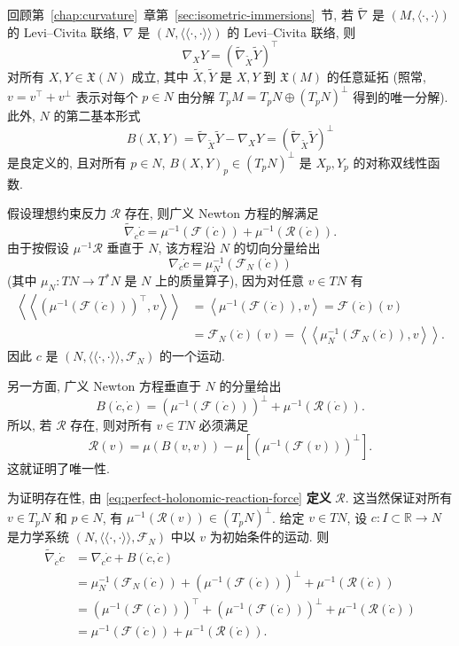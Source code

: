 \begin{RiemannProof}
回顾第~\ref{chap:curvature}~章第~\ref{sec:isometric-immersions}~节, 若 $\widetilde\nabla$ 是 $(M,\langle\cdot,\cdot\rangle)$ 的 Levi–Civita 联络, $\nabla$ 是 $(N,\langle\!\langle\cdot,\cdot\rangle\!\rangle)$ 的 Levi–Civita 联络, 则
\[
  \nabla_XY=(\widetilde\nabla_{\widetilde X}\widetilde Y)^\top
\]
对所有 $X,Y\in\mathfrak{X}(N)$ 成立, 其中 $\widetilde X,\widetilde Y$ 是 $X,Y$ 到 $\mathfrak{X}(M)$ 的任意延拓 (照常, $v=v^\top+v^\perp$ 表示对每个 $p\in N$ 由分解 $T_pM=T_pN\oplus(T_pN)^\perp$ 得到的唯一分解). 此外, $N$ 的第二基本形式
\[
  B(X,Y)=\widetilde\nabla_{\widetilde X}\widetilde Y-\nabla_XY
        =(\widetilde\nabla_{\widetilde X}\widetilde Y)^\perp
\]
是良定义的, 且对所有 $p\in N$, $B(X,Y)_p\in(T_pN)^\perp$ 是 $X_p,Y_p$ 的对称双线性函数.

假设理想约束反力 $\mathcal{R}$ 存在, 则广义 Newton 方程的解满足
\[
  \widetilde\nabla_{\dot c}\dot c=\mu^{-1}(\mathcal{F}(\dot c))+\mu^{-1}(\mathcal{R}(\dot c)).
\]
由于按假设 $\mu^{-1}\mathcal{R}$ 垂直于 $N$, 该方程沿 $N$ 的切向分量给出
\[
  \nabla_{\dot c}\dot c=\mu_N^{-1}(\mathcal{F}_N(\dot c))
\]
(其中 $\mu_N:TN\to T^*N$ 是 $N$ 上的质量算子), 因为对任意 $v\in TN$ 有
\begin{align*}
  \left\langle\!\left\langle(\mu^{-1}(\mathcal{F}(\dot c)))^\top,v\right\rangle\!\right\rangle
  &=\left\langle\mu^{-1}(\mathcal{F}(\dot c)),v\right\rangle=\mathcal{F}(\dot c)(v)\\
  &=\mathcal{F}_N(\dot c)(v)=\left\langle\!\left\langle\mu_N^{-1}(\mathcal{F}_N(\dot c)),v\right\rangle\!\right\rangle.
\end{align*}
因此 $c$ 是 $(N,\langle\!\langle\cdot,\cdot\rangle\!\rangle,\mathcal{F}_N)$ 的一个运动.

另一方面, 广义 Newton 方程垂直于 $N$ 的分量给出
\[
  B(\dot c,\dot c)=(\mu^{-1}(\mathcal{F}(\dot c)))^\perp+\mu^{-1}(\mathcal{R}(\dot c)).
\]
所以, 若 $\mathcal{R}$ 存在, 则对所有 $v\in TN$ 必须满足
\begin{equation}\label{eq:perfect-holonomic-reaction-force}
  \mathcal{R}(v)=\mu(B(v,v))-\mu\left[(\mu^{-1}(\mathcal{F}(v)))^\perp\right].
\end{equation}
这就证明了唯一性.

为证明存在性, 由 \eqref{eq:perfect-holonomic-reaction-force} \textbf{定义} $\mathcal{R}$. 这当然保证对所有 $v\in T_pN$ 和 $p\in N$, 有 $\mu^{-1}(\mathcal{R}(v))\in(T_pN)^\perp$. 给定 $v\in TN$, 设 $c:I\subset\mathbb{R}\to N$ 是力学系统 $(N,\langle\!\langle\cdot,\cdot\rangle\!\rangle,\mathcal{F}_N)$ 中以 $v$ 为初始条件的运动. 则
\begin{align*}
  \widetilde\nabla_{\dot c}\dot c
  &=\nabla_{\dot c}\dot c+B(\dot c,\dot c)\\
  &=\mu_N^{-1}(\mathcal{F}_N(\dot c))
     +(\mu^{-1}(\mathcal{F}(\dot c)))^\perp+\mu^{-1}(\mathcal{R}(\dot c))\\
  &=(\mu^{-1}(\mathcal{F}(\dot c)))^\top
     +(\mu^{-1}(\mathcal{F}(\dot c)))^\perp+\mu^{-1}(\mathcal{R}(\dot c))\\
  &=\mu^{-1}(\mathcal{F}(\dot c))+\mu^{-1}(\mathcal{R}(\dot c)).
\end{align*}
\end{RiemannProof}

